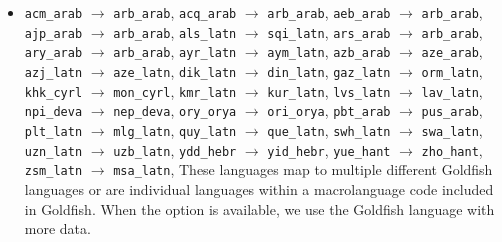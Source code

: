 \documentclass[11pt]{article}
\begin{document}
\begin{itemize}[leftmargin=0.5cm,itemsep=0.0cm,topsep=0.1cm]
\item
\texttt{acm\_arab} $\to$ \texttt{arb\_arab}, \newline
\texttt{acq\_arab} $\to$ \texttt{arb\_arab}, \newline
\texttt{aeb\_arab} $\to$ \texttt{arb\_arab}, \newline
\texttt{ajp\_arab} $\to$ \texttt{arb\_arab}, \newline
\texttt{als\_latn} $\to$ \texttt{sqi\_latn}, \newline
\texttt{ars\_arab} $\to$ \texttt{arb\_arab}, \newline
\texttt{ary\_arab} $\to$ \texttt{arb\_arab}, \newline
\texttt{ayr\_latn} $\to$ \texttt{aym\_latn}, \newline
\texttt{azb\_arab} $\to$ \texttt{aze\_arab}, \newline
\texttt{azj\_latn} $\to$ \texttt{aze\_latn}, \newline
\texttt{dik\_latn} $\to$ \texttt{din\_latn}, \newline
\texttt{gaz\_latn} $\to$ \texttt{orm\_latn}, \newline
\texttt{khk\_cyrl} $\to$ \texttt{mon\_cyrl}, \newline
\texttt{kmr\_latn} $\to$ \texttt{kur\_latn}, \newline
\texttt{lvs\_latn} $\to$ \texttt{lav\_latn}, \newline
\texttt{npi\_deva} $\to$ \texttt{nep\_deva}, \newline
\texttt{ory\_orya} $\to$ \texttt{ori\_orya}, \newline
\texttt{pbt\_arab} $\to$ \texttt{pus\_arab}, \newline
\texttt{plt\_latn} $\to$ \texttt{mlg\_latn}, \newline
\texttt{quy\_latn} $\to$ \texttt{que\_latn}, \newline
\texttt{swh\_latn} $\to$ \texttt{swa\_latn}, \newline
\texttt{uzn\_latn} $\to$ \texttt{uzb\_latn}, \newline
\texttt{ydd\_hebr} $\to$ \texttt{yid\_hebr}, \newline
\texttt{yue\_hant} $\to$ \texttt{zho\_hant}, \newline
\texttt{zsm\_latn} $\to$ \texttt{msa\_latn}, \newline
These languages map to multiple different Goldfish languages or are individual languages within a macrolanguage code included in Goldfish. When the option is available, we use the Goldfish language with more data.
\end{itemize}
\end{document}
